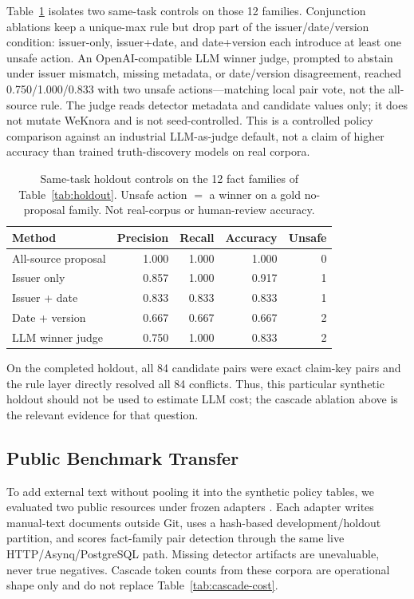 \documentclass[conference]{IEEEtran}
\begin{document}
Table~\ref{tab:holdout-compare} isolates two same-task controls on those 12 families. Conjunction ablations keep a unique-max rule but drop part of the issuer/date/version condition: issuer-only, issuer+date, and date+version each introduce at least one unsafe action. An OpenAI-compatible LLM winner judge, prompted to abstain under issuer mismatch, missing metadata, or date/version disagreement, reached 0.750/1.000/0.833 with two unsafe actions---matching local pair vote, not the all-source rule. The judge reads detector metadata and candidate values only; it does not mutate WeKnora and is not seed-controlled. This is a controlled policy comparison against an industrial LLM-as-judge default, not a claim of higher accuracy than trained truth-discovery models on real corpora.

\begin{table}[t]
\caption{Same-task holdout controls on the 12 fact families of Table~\ref{tab:holdout}. Unsafe action $=$ a winner on a gold no-proposal family. Not real-corpus or human-review accuracy.}
\label{tab:holdout-compare}
\centering
\small
\begin{tabular}{lrrrr}
\toprule
Method & Precision & Recall & Accuracy & Unsafe \\
\midrule
All-source proposal & 1.000 & 1.000 & 1.000 & 0 \\
Issuer only & 0.857 & 1.000 & 0.917 & 1 \\
Issuer + date & 0.833 & 0.833 & 0.833 & 1 \\
Date + version & 0.667 & 0.667 & 0.667 & 2 \\
LLM winner judge & 0.750 & 1.000 & 0.833 & 2 \\
\bottomrule
\end{tabular}
\end{table}

On the completed holdout, all 84 candidate pairs were exact claim-key pairs and the rule layer directly resolved all 84 conflicts. Thus, this particular synthetic holdout should not be used to estimate LLM cost; the cascade ablation above is the relevant evidence for that question.

\subsection{Public Benchmark Transfer}
\label{sec:public-transfer}

To add external text without pooling it into the synthetic policy tables, we evaluated two public resources under frozen adapters \cite{ammarkhodja2024wikifactdiff,schuster2021vitaminc}. Each adapter writes manual-text documents outside Git, uses a hash-based development/holdout partition, and scores fact-family pair detection through the same live HTTP/Asynq/PostgreSQL path. Missing detector artifacts are unevaluable, never true negatives. Cascade token counts from these corpora are operational shape only and do not replace Table~\ref{tab:cascade-cost}.
\end{document}
